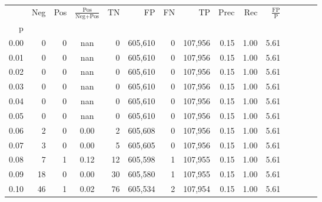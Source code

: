 \begin{tabular}{rrrcrrrrrrrrrrr}
\toprule
{} &     Neg &    Pos & $\frac{\text{Pos}}{\text{Neg}+\text{Pos}}$ &       TN &       FP &       FN &       TP &  Prec &   Rec & $\frac{\text{FP}}{\text{P}}$ \\
p    &         &        &                                            &          &          &          &          &       &       &                              \\
\midrule
0.00 &       0 &      0 &                                        nan &        0 &  605,610 &        0 &  107,956 &  0.15 &  1.00 &                         5.61 \\
0.01 &       0 &      0 &                                        nan &        0 &  605,610 &        0 &  107,956 &  0.15 &  1.00 &                         5.61 \\
0.02 &       0 &      0 &                                        nan &        0 &  605,610 &        0 &  107,956 &  0.15 &  1.00 &                         5.61 \\
0.03 &       0 &      0 &                                        nan &        0 &  605,610 &        0 &  107,956 &  0.15 &  1.00 &                         5.61 \\
0.04 &       0 &      0 &                                        nan &        0 &  605,610 &        0 &  107,956 &  0.15 &  1.00 &                         5.61 \\
0.05 &       0 &      0 &                                        nan &        0 &  605,610 &        0 &  107,956 &  0.15 &  1.00 &                         5.61 \\
0.06 &       2 &      0 &                                       0.00 &        2 &  605,608 &        0 &  107,956 &  0.15 &  1.00 &                         5.61 \\
0.07 &       3 &      0 &                                       0.00 &        5 &  605,605 &        0 &  107,956 &  0.15 &  1.00 &                         5.61 \\
0.08 &       7 &      1 &                                       0.12 &       12 &  605,598 &        1 &  107,955 &  0.15 &  1.00 &                         5.61 \\
0.09 &      18 &      0 &                                       0.00 &       30 &  605,580 &        1 &  107,955 &  0.15 &  1.00 &                         5.61 \\
0.10 &      46 &      1 &                                       0.02 &       76 &  605,534 &        2 &  107,954 &  0.15 &  1.00 &                         5.61 \\

\end{tabular}
